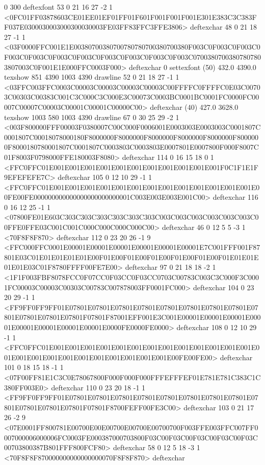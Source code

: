 0 300 deftexfont
53 0 21 16 27 -2 1 {{<0FC01FF03878603CE01EE01EF01FF01F601F001F001F001E301E383C3C383FF037E0300030003000300030003FE03FF83FFC3FFE3806>}} deftexchar
48 0 21 18 27 -1 1 {{<03F0000FFC001E1E00380700380700780780700380700380F003C0F003C0F003C0F003C0F003C0F003C0F003C0F003C0F003C0F003C0F003C07003807003807807803807003C0F001E1E000FFC0003F000>}} deftexchar
0 settexfont
(50) 432.0 4390.0 texshow
851 4390 1003 4390 drawline
52 0 21 18 27 -1 1 {{<03FFC003FFC0003C00003C00003C00003C00003C00FFFFC0FFFFC0E03C00703C00303C00383C001C3C000C3C000E3C00073C0003BC0001BC0001FC0000FC00007C00007C00003C00001C00001C00000C00>}} deftexchar
(40) 427.0 3628.0 texshow
1003 580 1003 4390 drawline
67 0 30 25 29 -2 1 {{<003F800000FFF00003F0380007C00C000F0006001E0003003E0003003C0001807C0001807C00018078000180F8000000F8000000F8000000F8000000F8000000F8000000F8000180780001807C0001807C0003803C0003803E0007801E0007800F000F8007C01F8003F0798000FFE180003F8080>}} deftexchar
114 0 16 15 18 0 1 {{<FFC0FFC01E001E001E001E001E001E001E001E001E001E001E001F0C1F1E1F9EFEFEFE7C>}} deftexchar
105 0 12 10 29 -1 1 {{<FFC0FFC01E001E001E001E001E001E001E001E001E001E001E001E001E001E00FE00FE000000000000000000000000001C003E003E003E001C00>}} deftexchar
116 0 16 12 25 -1 1 {{<07800FE01E603C303C303C303C303C303C303C003C003C003C003C003C003C00FFE0FFE03C001C001C000C000C000C000C00>}} deftexchar
46 0 12 5 5 -3 1 {{<70F8F8F870>}} deftexchar
112 0 23 20 26 -1 9 {{<FFC000FFC0001E00001E00001E00001E00001E00001E00001E7C001FFF001F87801E03C01E01E01E01E01E00F01E00F01E00F01E00F01E00F01E00F01E01E01E01E01E03C01F8780FFFF00FE7E00>}} deftexchar
97 0 21 18 18 -2 1 {{<1F1F003FBF8078FCC0F07CC0F03CC0F03CC0703C00783C003C3C000F3C0001FC00003C00003C00303C00783C007878003FF0001FC000>}} deftexchar
104 0 23 20 29 -1 1 {{<FF9FF0FF9FF01E07801E07801E07801E07801E07801E07801E07801E07801E07801E07801E07801E07801F07801F87001EFF001E3C001E00001E00001E00001E00001E00001E00001E00001E00001E0000FE0000FE0000>}} deftexchar
108 0 12 10 29 -1 1 {{<FFC0FFC01E001E001E001E001E001E001E001E001E001E001E001E001E001E001E001E001E001E001E001E001E001E001E001E001E00FE00FE00>}} deftexchar
101 0 18 15 18 -1 1 {{<07F00FF81E1C3C0E78067800F000F000F000FFFEFFFEF01E781E781C383C1C380FF003E0>}} deftexchar
110 0 23 20 18 -1 1 {{<FF9FF0FF9FF01E07801E07801E07801E07801E07801E07801E07801E07801E07801E07801E07801E07801F07801F8700FEFF00FE3C00>}} deftexchar
103 0 21 17 26 -2 9 {{<07E0001FF800781E00700E00E00700E00700E00700700F003FFE003FFC007FF0007000006000006FC0003FE000387000703800F03C00F03C00F03C00F03C00F03C00703800387B801FFF800FCF80>}} deftexchar
58 0 12 5 18 -3 1 {{<70F8F8F870000000000000000070F8F8F870>}} deftexchar
